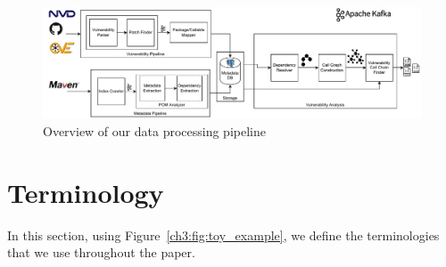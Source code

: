 \begin{figure}
    \centering
    \includegraphics[width=.9\linewidth]{chapters/ch3/figs/vuln-paper-approach.pdf}
    \caption{Overview of our data processing pipeline}
    \label{ch3:fig:dp_pipeline}
\end{figure}

\section{Terminology}\label{ch3:sec:terms}
In this section, using Figure~\ref{ch3:fig:toy_example}, we define the terminologies that we use throughout the paper.

